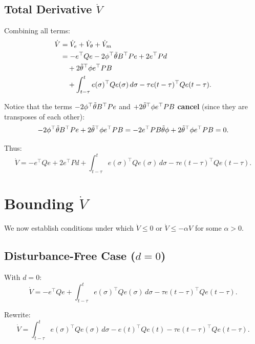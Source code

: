 \subsection{Total Derivative $\dot{V}$}

Combining all terms:
\begin{align}
    \dot{V} &= \dot{V}_e + \dot{V}_\theta + \dot{V}_m \nonumber \\
    &= -e^\top Q e - 2 \phi^\top \tilde{\theta} B^\top P e + 2 e^\top P d \nonumber \\
    &\quad + 2 \tilde{\theta}^\top \phi e^\top P B \nonumber \\
    &\quad + \int_{t-\tau}^t e(\sigma)^\top Q e(\sigma) \, d\sigma - \tau e(t-\tau)^\top Q e(t-\tau).
\end{align}

Notice that the terms $-2 \phi^\top \tilde{\theta} B^\top P e$ and $+2 \tilde{\theta}^\top \phi e^\top P B$ \textbf{cancel} (since they are transposes of each other):
\begin{equation}
    -2 \phi^\top \tilde{\theta} B^\top P e + 2 \tilde{\theta}^\top \phi e^\top P B = -2 e^\top P B \tilde{\theta} \phi + 2 \tilde{\theta}^\top \phi e^\top P B = 0.
\end{equation}

Thus:
\begin{equation}
    \label{eq:Vdot_main}
    \boxed{\dot{V} = -e^\top Q e + 2 e^\top P d + \int_{t-\tau}^t e(\sigma)^\top Q e(\sigma) \, d\sigma - \tau e(t-\tau)^\top Q e(t-\tau).}
\end{equation}

\section{Bounding $\dot{V}$}

We now establish conditions under which $\dot{V} \leq 0$ or $\dot{V} \leq -\alpha V$ for some $\alpha > 0$.

\subsection{Disturbance-Free Case ($d = 0$)}

With $d = 0$:
\begin{equation}
    \dot{V} = -e^\top Q e + \int_{t-\tau}^t e(\sigma)^\top Q e(\sigma) \, d\sigma - \tau e(t-\tau)^\top Q e(t-\tau).
\end{equation}

Rewrite:
\begin{equation}
    \dot{V} = \int_{t-\tau}^t e(\sigma)^\top Q e(\sigma) \, d\sigma - e(t)^\top Q e(t) - \tau e(t-\tau)^\top Q e(t-\tau).
\end{equation}

